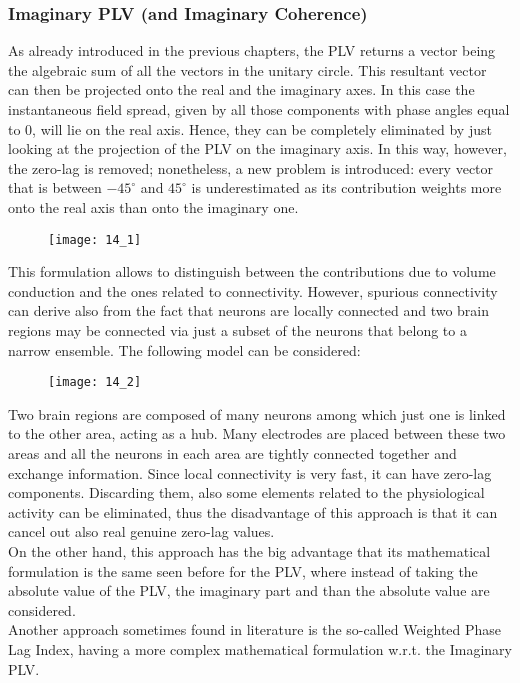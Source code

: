 \subsubsection{Imaginary PLV (and Imaginary Coherence)}
As already introduced in the previous chapters, the PLV returns a vector being the algebraic sum of all the
vectors in the unitary circle. This resultant vector can then be projected onto the real and the imaginary axes.
In this case the instantaneous field spread, given by all those components with phase angles equal to 0, will
lie on the real axis. Hence, they can be completely eliminated by just looking at the projection of the PLV on
the imaginary axis. In this way, however, the zero-lag is removed; nonetheless, a new problem is introduced:
every vector that is between \(-45^\circ\) and \(45^\circ\) is underestimated as its contribution weights
more onto the real axis than onto the imaginary one.
\begin{figure}[H]
    \centering
    \texttt{[image: 14\_1]}
\end{figure}
This formulation allows to distinguish between the contributions due to volume conduction and the ones
related to connectivity. However, spurious connectivity can derive also from the fact that neurons are
locally connected and two brain regions may be connected via just a subset of the neurons that belong to
a narrow ensemble. The following model can be considered:
\begin{figure}[H]
    \centering
    \texttt{[image: 14\_2]}
\end{figure}
Two brain regions are composed of many neurons among which just one is linked to the other area,
acting as a hub. Many electrodes are placed between these two areas and all the neurons in each area are
tightly connected together and exchange information. Since local connectivity is very fast, it can have
zero-lag components. Discarding them, also some elements related to the physiological activity can be
eliminated, thus the disadvantage of this approach is that it can cancel out also real genuine zero-lag
values.\\
On the other hand, this approach has the big advantage that its mathematical formulation is the same
seen before for the PLV, where instead of taking the absolute value of the PLV, the imaginary part and
than the absolute value are considered.\\
Another approach sometimes found in literature is the so-called Weighted Phase Lag Index, having a more
complex mathematical formulation w.r.t. the Imaginary PLV.

